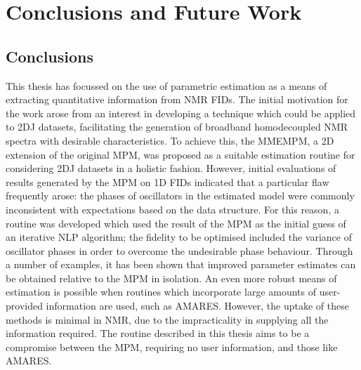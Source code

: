 \chapter{Conclusions and Future Work}
\label{chap:conclusions}

\section{Conclusions}
This thesis has focussed on the use of parametric estimation as a means of
extracting quantitative information from \ac{NMR} \acp{FID}. The initial
motivation for the work arose from an interest in developing a technique
which could be applied to \ac{2DJ} datasets, facilitating the generation of broadband
homodecoupled \ac{NMR} spectra with desirable characteristics.
To achieve this, the \ac{MMEMPM}, a \ac{2D} extension of the original \ac{MPM},
was proposed as a suitable estimation routine for considering \ac{2DJ} datasets
in a holistic fashion.
However, initial evaluations of results generated by the \ac{MPM} on
\ac{1D} \acp{FID} indicated that a particular flaw frequently arose: the phases
of oscillators in the estimated model were commonly inconsistent with
expectations based on the data structure.
For this reason, a routine was developed which used the result of the
\ac{MPM} as the initial guess of an iterative \ac{NLP} algorithm; the fidelity
to be optimised included the variance of oscillator phases in order to overcome
the undesirable phase behaviour.
Through a number of examples, it has been shown that improved parameter
estimates can be obtained relative to the \ac{MPM} in isolation.
An even more robust means of estimation is possible when routines which
incorporate large amounts of user-provided information are used, such as
\ac{AMARES}. However, the uptake of these methods is minimal in \ac{NMR}, due to
the impracticality in supplying all the information required. The routine
described in this thesis aims to be a compromise between the \ac{MPM},
requiring no user information, and those like \ac{AMARES}.

